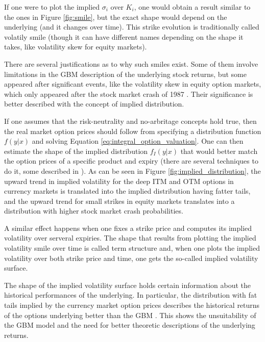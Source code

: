 \documentclass[12,twoside]{mammeTFM}
\theoremstyle{definition}
\theoremstyle{remark}
\begin{document}
If one were to plot the implied $\sigma_i$ over $K_i$, one would obtain a result similar to the ones in Figure \ref{fig:smile}, but the exact shape would depend on the underlying (and it changes over time). This strike evolution is traditionally called volatily smile (though it can have different names depending on the shape it takes, like volatility skew for equity markets).

There are several justifications as to why such smiles exist. Some of them involve limitations in the GBM description of the underlying stock returns, but some appeared after significant events, like the volatility skew in equity option markets, which only appeared after the stock market crash of 1987 \cite{hul09}. Their significance is better described with the concept of implied distribution.

If one assumes that the risk-neutrality and no-arbritage concepts hold true, then the real market option prices should follow from specifying a distribution function $f(y|x)$ and solving Equation \ref{eq:integral_option_valuation}. One can then estimate the shape of the implied distribution $f_I(y|x)$ that would better match the option prices of a specific product and expiry (there are several techniques to do it, some described in \cite{jac96, pea00}). As can be seen in Figure \ref{fig:implied_distribution}, the upward trend in implied volatility for the deep ITM and OTM options in currency markets is translated into the implied distribution having fatter tails, and the upward trend for small strikes in equity markets translates into a distribution with higher stock market crash probabilities.

A similar effect happens when one fixes a strike price and computes its implied volatility over serveral expiries. The shape that results from plotting the implied volatility smile over time is called term structure and, when one plots the implied volatility over both strike price and time, one gets the so-called implied volatility surface.

The shape of the implied volatility surface holds certain information about the historical performances of the underlying. In particular, the distribution with fat tails implied by the currency market option prices describes the historical returns of the options underlying better than the GBM \cite{hul09}. This shows the unsuitability of the GBM model and the need for better theoretic descriptions of the underlying returns.
\end{document}

